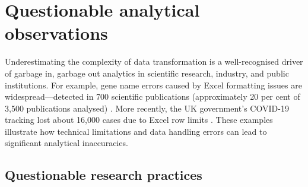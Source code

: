 \documentclass{article}
\begin{document}
\tableofcontents
\listoftables
\listoffigures


\section{Questionable analytical observations}

Underestimating the complexity of data transformation is a well-recognised driver of garbage in, garbage out analytics in scientific research, industry, and public institutions. For example, gene name errors caused by Excel formatting issues are widespread---detected in 700 scientific publications (approximately 20 per cent of 3,500 publications analysed) \cite{ziemann2016gene}. More recently, the UK government's COVID-19 tracking lost about 16,000 cases due to Excel row limits \cite{bbc2020excel}. These examples illustrate how technical limitations and data handling errors can lead to significant analytical inaccuracies.

\subsection{Questionable research practices}
\end{document}
